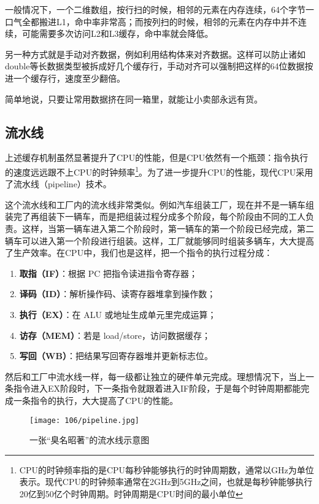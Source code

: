 一般情况下，一个二维数组，按行扫的时候，相邻的元素在内存连续，64个字节一口气全都搬进L1，命中率非常高；而按列扫的时候，相邻的元素在内存中并不连续，可能需要多次访问L2和L3缓存，命中率就会降低。

另一种方式就是手动对齐数据，例如利用结构体来对齐数据。这样可以防止诸如double等长数据类型被拆成好几个缓存行，手动对齐可以强制把这样的64位数据按进一个缓存行，速度至少翻倍。

简单地说，只要让常用数据挤在同一箱里，就能让小卖部永远有货。

\subsection{流水线}

上述缓存机制虽然显著提升了CPU的性能，但是CPU依然有一个瓶颈：指令执行的速度远远跟不上CPU的时钟频率\footnote{CPU的时钟频率指的是CPU每秒钟能够执行的时钟周期数，通常以GHz为单位表示。现代CPU的时钟频率通常在2GHz到5GHz之间，也就是每秒钟能够执行20亿到50亿个时钟周期。时钟周期是CPU时间的最小单位}。为了进一步提升CPU的性能，现代CPU采用了流水线（pipeline）技术。

这个流水线和工厂内的流水线非常类似。例如汽车组装工厂，现在并不是一辆车组装完了再组装下一辆车，而是把组装过程分成多个阶段，每个阶段由不同的工人负责。这样，当第一辆车进入第二个阶段时，第一辆车的第一个阶段已经完成，第二辆车可以进入第一个阶段进行组装。这样，工厂就能够同时组装多辆车，大大提高了生产效率。在CPU中，我们也是这样，把一个指令的执行过程分成：
\begin{enumerate}
\item \textbf{取指（IF）}：根据 PC 把指令读进指令寄存器；
\item \textbf{译码（ID）}：解析操作码、读寄存器堆拿到操作数；
\item \textbf{执行（EX）}：在 ALU 或地址生成单元里完成运算；
\item \textbf{访存（MEM）}：若是 load/store，访问数据缓存；
\item \textbf{写回（WB）}：把结果写回寄存器堆并更新标志位。
\end{enumerate}
然后和工厂中流水线一样，每一级都让独立的硬件单元完成。理想情况下，当上一条指令进入EX阶段时，下一条指令就跟着进入IF阶段，于是每个时钟周期都能完成一条指令的执行，大大提高了CPU的性能。

\begin{figure}[htbp]
  \centering
  \texttt{[image: 106/pipeline.jpg]}
  \caption{一张“臭名昭著”的流水线示意图}
\end{figure}

